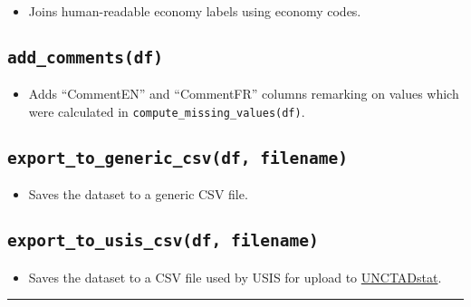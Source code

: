 \documentclass[
]{book}
\providecommand{\tightlist}{%
  \setlength{\itemsep}{0pt}\setlength{\parskip}{0pt}}
\begin{document}
\begin{itemize}
\tightlist
\item
  Joins human-readable economy labels using economy codes.
\end{itemize}

\subsection*{\texorpdfstring{\texttt{add\_comments(df)}}{add\_comments(df)}}\label{add_commentsdf}

\begin{itemize}
\tightlist
\item
  Adds ``CommentEN'' and ``CommentFR'' columns remarking on values which were calculated in \texttt{compute\_missing\_values(df)}.
\end{itemize}

\subsection*{\texorpdfstring{\texttt{export\_to\_generic\_csv(df,\ filename)}}{export\_to\_generic\_csv(df, filename)}}\label{export_to_generic_csvdf-filename}

\begin{itemize}
\tightlist
\item
  Saves the dataset to a generic CSV file.
\end{itemize}

\subsection*{\texorpdfstring{\texttt{export\_to\_usis\_csv(df,\ filename)}}{export\_to\_usis\_csv(df, filename)}}\label{export_to_usis_csvdf-filename}

\begin{itemize}
\tightlist
\item
  Saves the dataset to a CSV file used by USIS for upload to \href{https://unctadstat.unctad.org/datacentre/dataviewer/US.GDPTotal}{UNCTADstat}.
\end{itemize}

\begin{center}\rule{0.5\linewidth}{0.5pt}\end{center}
\end{document}
